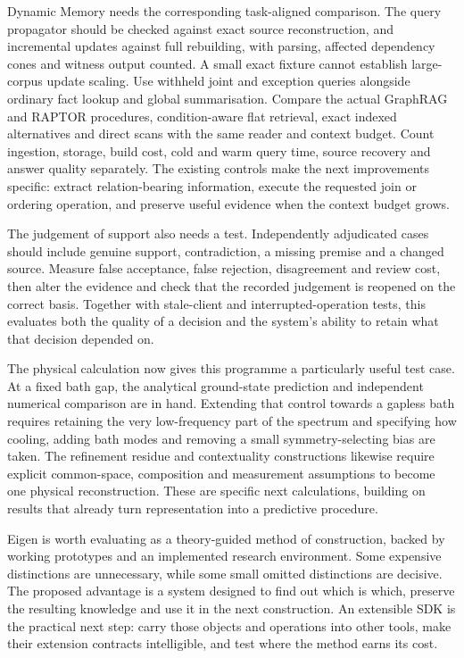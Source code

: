 Dynamic Memory needs the corresponding task-aligned comparison. The query propagator should be checked against exact source reconstruction, and incremental updates against full rebuilding, with parsing, affected dependency cones and witness output counted. A small exact fixture cannot establish large-corpus update scaling. Use withheld joint and exception queries alongside ordinary fact lookup and global summarisation. Compare the actual GraphRAG and RAPTOR procedures, condition-aware flat retrieval, exact indexed alternatives and direct scans with the same reader and context budget. Count ingestion, storage, build cost, cold and warm query time, source recovery and answer quality separately. The existing controls make the next improvements specific: extract relation-bearing information, execute the requested join or ordering operation, and preserve useful evidence when the context budget grows.

The judgement of support also needs a test. Independently adjudicated cases should include genuine support, contradiction, a missing premise and a changed source. Measure false acceptance, false rejection, disagreement and review cost, then alter the evidence and check that the recorded judgement is reopened on the correct basis. Together with stale-client and interrupted-operation tests, this evaluates both the quality of a decision and the system's ability to retain what that decision depended on.

The physical calculation now gives this programme a particularly useful test case. At a fixed bath gap, the analytical ground-state prediction and independent numerical comparison are in hand. Extending that control towards a gapless bath requires retaining the very low-frequency part of the spectrum and specifying how cooling, adding bath modes and removing a small symmetry-selecting bias are taken. The refinement residue and contextuality constructions likewise require explicit common-space, composition and measurement assumptions to become one physical reconstruction. These are specific next calculations, building on results that already turn representation into a predictive procedure.

Eigen is worth evaluating as a theory-guided method of construction, backed by working prototypes and an implemented research environment. Some expensive distinctions are unnecessary, while some small omitted distinctions are decisive. The proposed advantage is a system designed to find out which is which, preserve the resulting knowledge and use it in the next construction. An extensible SDK is the practical next step: carry those objects and operations into other tools, make their extension contracts intelligible, and test where the method earns its cost.
